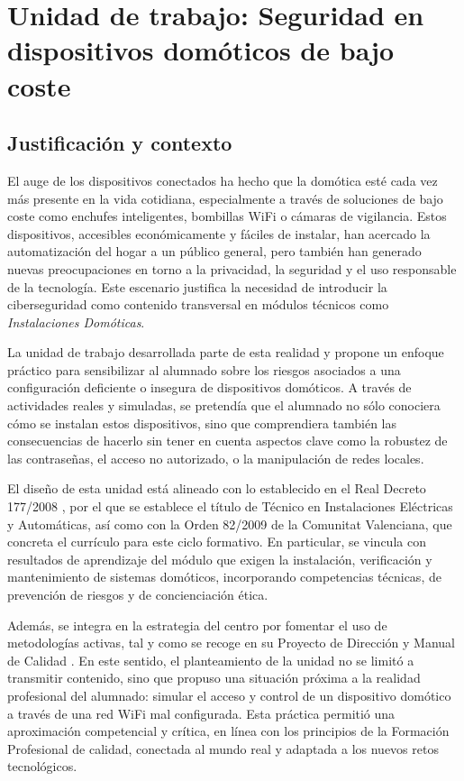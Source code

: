 \chapter{Unidad de trabajo: Seguridad en dispositivos domóticos de bajo coste}


\section{Justificación y contexto}
El auge de los dispositivos conectados ha hecho que la domótica esté cada vez más presente en la vida cotidiana, especialmente a través de soluciones de bajo coste como enchufes inteligentes, bombillas WiFi o cámaras de vigilancia. Estos dispositivos, accesibles económicamente y fáciles de instalar, han acercado la automatización del hogar a un público general, pero también han generado nuevas preocupaciones en torno a la privacidad, la seguridad y el uso responsable de la tecnología. Este escenario justifica la necesidad de introducir la ciberseguridad como contenido transversal en módulos técnicos como \textit{Instalaciones Domóticas}.

La unidad de trabajo desarrollada parte de esta realidad y propone un enfoque práctico para sensibilizar al alumnado sobre los riesgos asociados a una configuración deficiente o insegura de dispositivos domóticos. A través de actividades reales y simuladas, se pretendía que el alumnado no sólo conociera cómo se instalan estos dispositivos, sino que comprendiera también las consecuencias de hacerlo sin tener en cuenta aspectos clave como la robustez de las contraseñas, el acceso no autorizado, o la manipulación de redes locales.

El diseño de esta unidad está alineado con lo establecido en el Real Decreto 177/2008 \cite{RD1772008}, por el que se establece el título de Técnico en Instalaciones Eléctricas y Automáticas, así como con la Orden 82/2009 \cite{Orden82_2009} de la Comunitat Valenciana, que concreta el currículo para este ciclo formativo. En particular, se vincula con resultados de aprendizaje del módulo que exigen la instalación, verificación y mantenimiento de sistemas domóticos, incorporando competencias técnicas, de prevención de riesgos y de concienciación ética.

Además, se integra en la estrategia del centro por fomentar el uso de metodologías activas, tal y como se recoge en su Proyecto de Dirección \cite{proyectoDireccion2022} y Manual de Calidad \cite{politicaCalidadCanastell}. En este sentido, el planteamiento de la unidad no se limitó a transmitir contenido, sino que propuso una situación próxima a la realidad profesional del alumnado: simular el acceso y control de un dispositivo domótico a través de una red WiFi mal configurada. Esta práctica permitió una aproximación competencial y crítica, en línea con los principios de la Formación Profesional de calidad, conectada al mundo real y adaptada a los nuevos retos tecnológicos.

